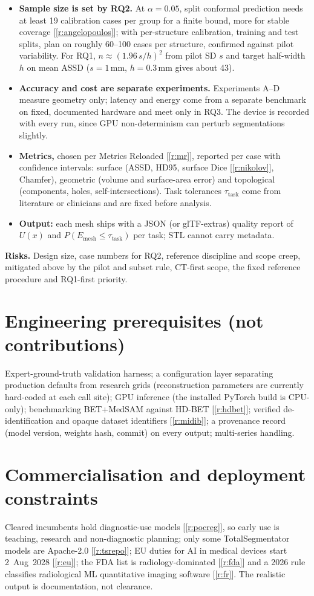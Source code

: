 \documentclass[10pt,a4paper]{article}
\newcommand{\rf}[1]{\ref{#1}}
\begin{document}
\begin{itemize}
\item \textbf{Sample size is set by RQ2.} At $\alpha=0.05$, split conformal prediction needs at least 19 calibration cases per group for a finite bound, more for stable coverage [\rf{r:angelopoulos}]; with per-structure calibration, training and test splits, plan on roughly 60--100 cases per structure, confirmed against pilot variability. For RQ1, $n\approx(1.96\,s/h)^2$ from pilot SD $s$ and target half-width $h$ on mean ASSD ($s=1$\,mm, $h=0.3$\,mm gives about 43).
\item \textbf{Accuracy and cost are separate experiments.} Experiments A--D measure geometry only; latency and energy come from a separate benchmark on fixed, documented hardware and meet only in RQ3. The device is recorded with every run, since GPU non-determinism can perturb segmentations slightly.
\item \textbf{Metrics,} chosen per Metrics Reloaded [\rf{r:mr}], reported per case with confidence intervals: surface (ASSD, HD95, surface Dice [\rf{r:nikolov}], Chamfer), geometric (volume and surface-area error) and topological (components, holes, self-intersections). Task tolerances $\tau_{\text{task}}$ come from literature or clinicians and are fixed before analysis.
\item \textbf{Output:} each mesh ships with a JSON (or glTF-extras) quality report of $U(x)$ and $P(E_{\text{mesh}}\le\tau_{\text{task}})$ per task; STL cannot carry metadata.
\end{itemize}
\textbf{Risks.} Design size, case numbers for RQ2, reference discipline and scope creep, mitigated above by the pilot and subset rule, CT-first scope, the fixed reference procedure and RQ1-first priority.

\section{Engineering prerequisites (not contributions)}
Expert-ground-truth validation harness; a configuration layer separating production defaults from research grids (reconstruction parameters are currently hard-coded at each call site); GPU inference (the installed PyTorch build is CPU-only); benchmarking BET+MedSAM against HD-BET [\rf{r:hdbet}]; verified de-identification and opaque dataset identifiers [\rf{r:midib}]; a provenance record (model version, weights hash, commit) on every output; multi-series handling.

\section{Commercialisation and deployment constraints}
Cleared incumbents hold diagnostic-use models [\rf{r:pocreg}], so early use is teaching, research and non-diagnostic planning; only some TotalSegmentator models are Apache-2.0 [\rf{r:tsrepo}]; EU duties for AI in medical devices start 2~Aug~2028 [\rf{r:eu}]; the FDA list is radiology-dominated [\rf{r:fda}] and a 2026 rule classifies radiological ML quantitative imaging software [\rf{r:fr}]. The realistic output is documentation, not clearance.
\end{document}
